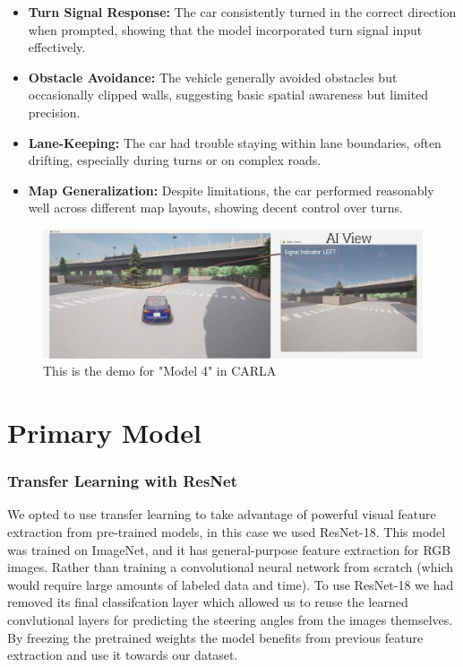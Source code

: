 \documentclass{article} %
\begin{document}
\begin{itemize}
  \item \textbf{Turn Signal Response:} The car consistently turned in the correct direction when prompted, showing that the model incorporated turn signal input effectively.

  \item \textbf{Obstacle Avoidance:} The vehicle generally avoided obstacles but occasionally clipped walls, suggesting basic spatial awareness but limited precision.

  \item \textbf{Lane-Keeping:} The car had trouble staying within lane boundaries, often drifting, especially during turns or on complex roads.

  \item \textbf{Map Generalization:} Despite limitations, the car performed reasonably well across different map layouts, showing decent control over turns.
\end{itemize}


\begin{figure}[H] %
    \centering
    \includegraphics[width=1.0\textwidth]{model4demo.png} %
    \caption{This is the demo for "Model 4" in CARLA}
    \label{fig:model4demo}
\end{figure}


\section{Primary Model}


\subsubsection{Transfer Learning with ResNet}

We opted to use transfer learning to take advantage of powerful visual feature extraction from pre-trained models, in this case we
used ResNet-18. This model was trained on ImageNet, and it has general-purpose feature extraction for RGB images. Rather than training
a convolutional neural network from scratch (which would require large amounts of labeled data and time). To use ResNet-18 we had 
removed its final classifcation layer which allowed us to reuse the learned convlutional layers for predicting the steering angles from 
the images themselves. By freezing the pretrained weights the model benefits from previous feature extraction and use it towards our dataset.
\end{document}
